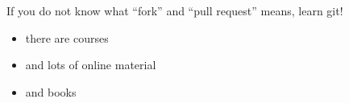 \begin{frame}
  \frametitle{}
  If you do not know what ``fork'' and ``pull request'' means, learn git!
  \begin{itemize}[<+->]
   \item there are courses
   \item and lots of online material
   \item and books
  \end{itemize}
  \pause
\end{frame}


